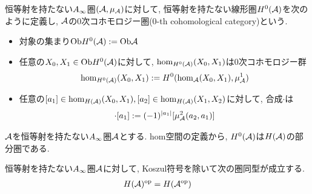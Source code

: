 \documentclass[uplatex, a4paper, 14Q, dvipdfmx]{jsarticle}
\begin{document}
\begin{definition}[$0$次コホモロジー圏]
  恒等射を持たない$A_{\infty}$圏$(\mathcal{A},\mu_{\mathcal{A}})$に対して, 恒等射を持たない線形圏$H^0(\mathcal{A})$を次のように定義し, $\mathcal{A}$の$0$次コホモロジー圏($0$-th cohomological category)という. 
  \begin{itemize}
    \item 対象の集まり$\mathrm{Ob} H^0(\mathcal{A}) := \mathrm{Ob}\mathcal{A}$
    \item 任意の$X_0, X_1 \in \mathrm{Ob} H^0(\mathcal{A})$に対して, $\hom_{H^0(\mathcal{A})}(X_0,X_1)$は$0$次コホモロジー群
    \begin{align*}
      \hom_{H^0(\mathcal{A})}(X_0,X_1) := H^0(\hom_{\mathcal{A}}(X_0,X_1), \mu^1_{\mathcal{A}})
    \end{align*}
    \item 任意の$[a_1] \in \hom_{H(\mathcal{A})}(X_0,X_1), [a_2] \in \hom_{H(\mathcal{A})}(X_1,X_2)$に対して, 合成$\cdot$は
    \begin{align*}
      [a_2] \cdot [a_1] := (-1)^{|a_1|} [\mu^2_\A(a_2,a_1)]
    \end{align*}
  \end{itemize}
\end{definition}


\begin{remark}
  $\mathcal{A}$を恒等射を持たない$A_{\infty}$圏$\mathcal{A}$とする. 
  hom空間の定義から, $H^0(\mathcal{A})$は$H(\mathcal{A})$の部分圏である.
\end{remark}

\begin{lemma}
  恒等射を持たない$A_{\infty}$圏$\mathcal{A}$に対して, Koszul符号を除いて次の圏同型が成立する. 
  \begin{align*}
    H(\mathcal{A})^{\mathrm{op}} = H(\mathcal{A}^\mathrm{op})
  \end{align*}
\end{lemma}

\end{document}

